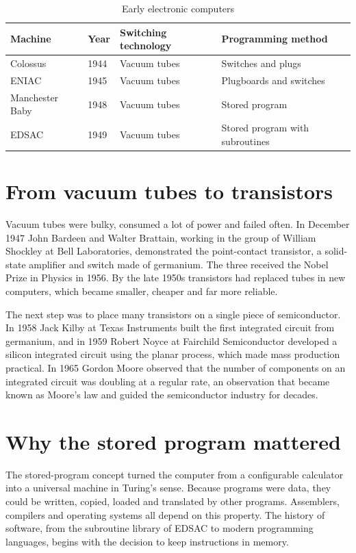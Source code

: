 \documentclass[11pt,a4paper]{article}
\begin{document}
\begin{table}[h]
\centering
\begin{tabular}{>{\raggedright}p{2.8cm} >{\raggedright}p{1.6cm} >{\raggedright}p{3.6cm} >{\raggedright\arraybackslash}p{4.2cm}}
\toprule
Machine & Year & Switching technology & Programming method \\
\midrule
Colossus & 1944 & Vacuum tubes & Switches and plugs \\
ENIAC & 1945 & Vacuum tubes & Plugboards and switches \\
Manchester Baby & 1948 & Vacuum tubes & Stored program \\
EDSAC & 1949 & Vacuum tubes & Stored program with subroutines \\
\bottomrule
\end{tabular}
\caption{Early electronic computers}
\label{tab:machines}
\end{table}

\section{From vacuum tubes to transistors}

Vacuum tubes were bulky, consumed a lot of power and failed often. In
December 1947 John Bardeen and Walter Brattain, working in the group of
William Shockley at Bell Laboratories, demonstrated the point-contact
transistor, a solid-state amplifier and switch made of germanium. The three
received the Nobel Prize in Physics in 1956. By the late 1950s transistors
had replaced tubes in new computers, which became smaller, cheaper and far
more reliable.

The next step was to place many transistors on a single piece of
semiconductor. In 1958 Jack Kilby at Texas Instruments built the first
integrated circuit from germanium, and in 1959 Robert Noyce at Fairchild
Semiconductor developed a silicon integrated circuit using the planar
process, which made mass production practical. In 1965 Gordon Moore
observed that the number of components on an integrated circuit was
doubling at a regular rate, an observation that became known as Moore's law
and guided the semiconductor industry for decades.

\section{Why the stored program mattered}

The stored-program concept turned the computer from a configurable
calculator into a universal machine in Turing's sense. Because programs were
data, they could be written, copied, loaded and translated by other
programs. Assemblers, compilers and operating systems all depend on this
property. The history of software, from the subroutine library of EDSAC to
modern programming languages, begins with the decision to keep instructions
in memory.
\end{document}
